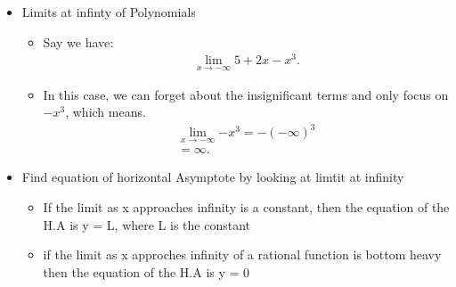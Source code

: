 \documentclass{report}
\begin{document}
    \begin{itemize}
      \item Limits at infinty of Polynomials
        \begin{itemize}
          \item Say we have:
            \begin{align*}
              \lim_{x \to -\infty}{5+2x-x^{3}}
            .\end{align*}
          \item In this case, we can forget about the insignificant terms and only focus on $-x^{3}$, which means.
            \begin{align*}
              \lim_{x \to -\infty}{-x^{3}} = -(-\infty)^{3} \\
              = \infty
            .\end{align*}
        \end{itemize}
    \end{itemize}
    \begin{itemize}
      \item Find equation of horizontal Asymptote by looking at limtit at infinity
        \begin{itemize}
          \item If the limit as x approaches infinity is a constant, then the equation of the H.A is y = L, where L is the constant
          \item if the limit as x approches infinity of a rational function is bottom heavy then the equation of the H.A is y = 0 
        \end{itemize}
    \end{itemize}

    \bigbreak \noindent \bigbreak \noindent 
\end{document}
